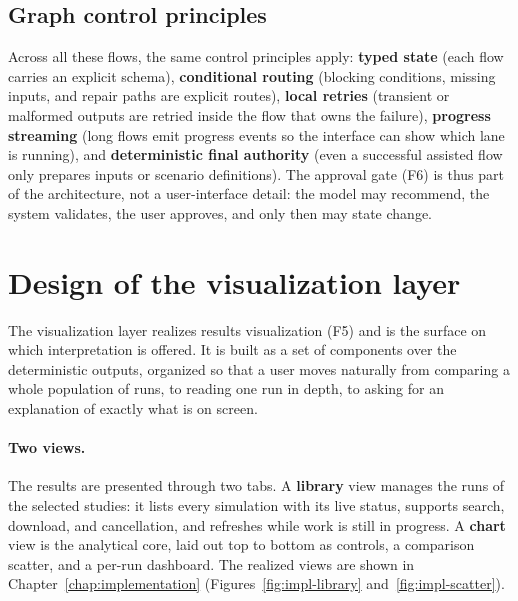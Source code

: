 \subsection{Graph control principles}

Across all these flows, the same control principles apply: \textbf{typed state}
(each flow carries an explicit schema), \textbf{conditional routing} (blocking
conditions, missing inputs, and repair paths are explicit routes),
\textbf{local retries} (transient or malformed outputs are retried inside the flow
that owns the failure), \textbf{progress streaming} (long flows emit progress
events so the interface can show which lane is running), and \textbf{deterministic
final authority} (even a successful assisted flow only prepares inputs or scenario
definitions). The approval gate (F6) is thus part of the architecture, not a
user-interface detail: the model may recommend, the system validates, the user
approves, and only then may state change.

\section{Design of the visualization layer}
\label{sec:viz-design}

The visualization layer realizes results visualization (F5) and is the
surface on which interpretation is offered. It is built as a set of components over
the deterministic outputs, organized so that a user moves naturally from comparing
a whole population of runs, to reading one run in depth, to asking for an
explanation of exactly what is on screen.

\paragraph{Two views.} The results are presented through two tabs. A
\textbf{library} view manages the runs of the
selected studies: it lists every
simulation with its live status, supports search, download, and cancellation, and
refreshes while work is still in progress. A \textbf{chart} view is the analytical
core, laid out top to bottom as controls, a comparison scatter, and a per-run
dashboard. The realized views are shown in Chapter~\ref{chap:implementation}
(Figures~\ref{fig:impl-library} and~\ref{fig:impl-scatter}).

